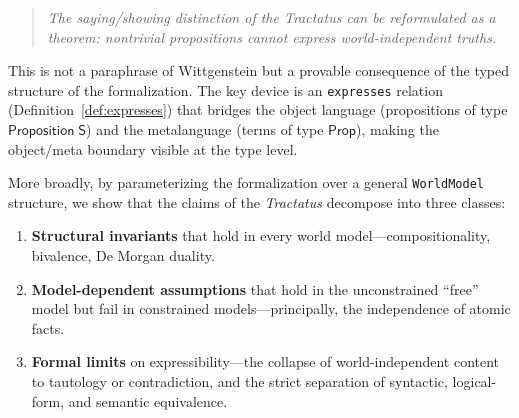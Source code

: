 \documentclass[jsl,bibother]{asl}
\theoremstyle{definition}
\theoremstyle{remark}
\newcommand{\Sach}{\mathsf{S}}
\newcommand{\Prop}{\mathsf{Prop}}
\begin{document}
\begin{quote}
\emph{The saying/showing distinction of the \emph{Tractatus} can
be reformulated as a theorem: nontrivial propositions cannot
express world-independent truths.}
\end{quote}

\noindent
This is not a paraphrase of Wittgenstein but a provable
consequence of the typed structure of the formalization.
The key device is an \texttt{expresses} relation (Definition~\ref{def:expresses})
that bridges the object language (propositions of type
$\mathsf{Proposition}\;\Sach$) and the metalanguage (terms of
type $\Prop$), making the object/meta boundary visible at the
type level.

More broadly, by parameterizing the formalization over a general
\texttt{WorldModel} structure, we show that the claims of the
\emph{Tractatus} decompose into three classes:
\begin{enumerate}[nosep]
  \item \textbf{Structural invariants} that hold in every world
    model---compositionality, bivalence, De Morgan duality.
  \item \textbf{Model-dependent assumptions} that hold in the
    unconstrained ``free'' model but fail in constrained
    models---principally, the independence of atomic facts.
  \item \textbf{Formal limits} on expressibility---the collapse
    of world-independent content to tautology or contradiction,
    and the strict separation of syntactic, logical-form, and
    semantic equivalence.
\end{enumerate}
\end{document}

